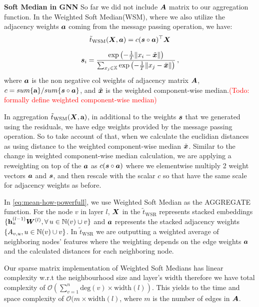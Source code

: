 \documentclass{article} %
\newcommand{\adj}{\mA}
\newcommand{\weight}{\mW}
\newcommand{\features}{\mX}
\newcommand{\featset}{\sX}
\newcommand{\softout}{\vs}
\newcommand{\neighbors}{\sN}
\newcommand{\todo}[1]{\textcolor{red}{(Todo: #1)}}
\begin{document}
\textbf{Soft Median in GNN}
So far we did not include \(\adj\) matrix to our aggregation function. In the Weighted Soft Median(WSM), where we also utilize the adjacency weights ${\bm{a}}$ coming from the message passing operation, we have:
\begin{equation}\label{eq:WSR}
    \tilde{t}_{\text{WSM}}(\features, \va) = c({\softout} \circ \va)^\top\features 
\end{equation}

\begin{equation}\label{eq:softoutweighted}
    {\softout}_i 
    = \frac{\exp{\left(-\frac{1}{T} \|\evx_i - \tilde{\vx}\| \right )}}{\sum_{\evx_j \in \featset} \exp{\left (-\frac{1}{T} \|\evx_j - \bar{\vx}\| \right )}}\,,
\end{equation}
where ${\bm{a}}$ is the non negative col weights of adjacency matrix $\adj$,  $ c = sum\{\textbf{a}\} / sum\{{\softout} \circ \va\} $, and $\tilde{{\bm{x}}}$ is the weighted component-wise median.\todo{formally define weighted component-wise median} 

In aggregation $\tilde{t}_{\text{WSM}}(\features, \textbf{a})$, in additional to the weights $\softout$ that we generated using the residuals, we have edge weights provided by the message passing operation. So to take account of that, when we calculate the euclidian distances as using distance to the weighted component-wise median $\tilde{{\bm{x}}}$. Similar to the change in weighted component-wise median calculation, we are applying a reweighting on top of the ${\bm{a}}$ as $c({\softout} \circ \va)$ where we elementwise multiply 2 weight vectors ${\bm{a}}$ and $\softout$, and then rescale with the scalar $c$ so that have the same scale for adjacency weights as before.

In \autoref{eq:mean-how-powerfull}, we use Weighted Soft Median as the AGGREGATE function. For the node $v$ in layer $l$, $\features$ in the $\tilde{t}_{\text{WSR}}$ represents stacked embeddings $\{\mathbf{h}^{(l-1)}_u \weight^{(l)}, \forall \, u\in \neighbors(v) \cup v\} $ and ${\bm{a}}$   represents the stacked adjacency weights $\{\emA_{v,u}, u\in \neighbors(v) \cup v\}$. In $\tilde{t}_{\text{WSR}}$ we are outputting a weighted average of neighboring nodes' features where the weighting depends on the edge weights ${\bm{a}}$ and the calculated distances for each neighboring node.

Our sparse matrix implementation of Weighted Soft Medians has linear complexity w.r.t the neighbourhood size and layer's width therefore we have total complexity of $\mathcal{O}(\sum_{v=1}^n \text{deg}(v)\times \text{width}(l))$. This yields to the time and space complexity of $\mathcal{O}( m\times\text{width}(l)$, where $m$ is the number of edges in $\adj$.
\end{document}
